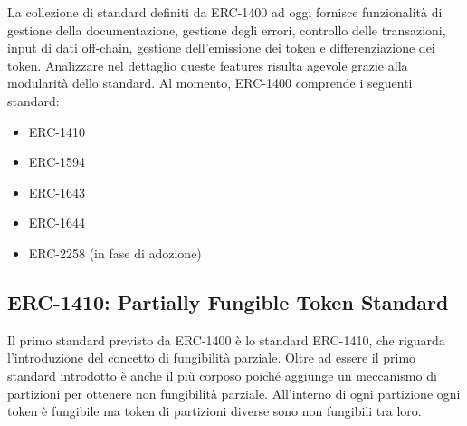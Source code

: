 La collezione di standard definiti da ERC-1400 ad oggi fornisce funzionalità di gestione della documentazione, gestione degli errori, controllo delle transazioni, input di dati off-chain, gestione dell'emissione dei token e differenziazione dei token. 
Analizzare nel dettaglio queste features risulta agevole grazie alla modularità dello standard. Al momento, ERC-1400 comprende i seguenti standard:
\begin{itemize}
    \item ERC-1410
    \item ERC-1594
    \item ERC-1643
    \item ERC-1644
    \item ERC-2258 (in fase di adozione) 
\end{itemize}

\subsection{ERC-1410: Partially Fungible Token Standard}
Il primo standard previsto da ERC-1400 è lo standard ERC-1410, che riguarda l'introduzione del concetto di fungibilità parziale. Oltre ad essere il primo standard introdotto è anche il più corposo poiché aggiunge un meccanismo di partizioni per ottenere non fungibilità parziale. All'interno di ogni partizione ogni token è fungibile ma token di partizioni diverse sono non fungibili tra loro.   

